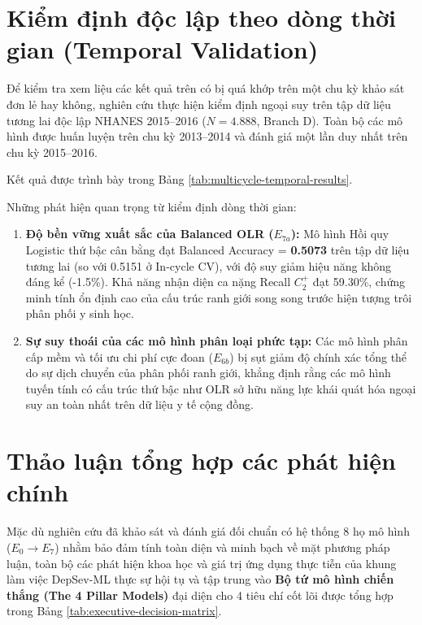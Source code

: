 \section{Kiểm định độc lập theo dòng thời gian (Temporal Validation)}
\label{sec:temporal-results}

Để kiểm tra xem liệu các kết quả trên có bị quá khớp trên một chu kỳ khảo sát đơn lẻ hay không, nghiên cứu thực hiện kiểm định ngoại suy trên tập dữ liệu tương lai độc lập NHANES 2015--2016 ($N = 4.888$, Branch D). Toàn bộ các mô hình được huấn luyện trên chu kỳ 2013--2014 và đánh giá một lần duy nhất trên chu kỳ 2015--2016.

Kết quả được trình bày trong Bảng \ref{tab:multicycle-temporal-results}.



Những phát hiện quan trọng từ kiểm định dòng thời gian:
\begin{enumerate}
    \item \textbf{Độ bền vững xuất sắc của Balanced OLR ($E_{7a}$):} Mô hình Hồi quy Logistic thứ bậc cân bằng đạt Balanced Accuracy = \textbf{0.5073} trên tập dữ liệu tương lai (so với 0.5151 ở In-cycle CV), với độ suy giảm hiệu năng không đáng kể (-1.5\%). Khả năng nhận diện ca nặng Recall $C_2^+$ đạt 59.30\%, chứng minh tính ổn định cao của cấu trúc ranh giới song song trước hiện tượng trôi phân phối y sinh học.
    \item \textbf{Sự suy thoái của các mô hình phân loại phức tạp:} Các mô hình phân cấp mềm và tối ưu chi phí cực đoan ($E_{6b}$) bị sụt giảm độ chính xác tổng thể do sự dịch chuyển của phân phối ranh giới, khẳng định rằng các mô hình tuyến tính có cấu trúc thứ bậc như OLR sở hữu năng lực khái quát hóa ngoại suy an toàn nhất trên dữ liệu y tế cộng đồng.
\end{enumerate}

\section{Thảo luận tổng hợp các phát hiện chính}
\label{sec:thao-luan-tong-hop}

Mặc dù nghiên cứu đã khảo sát và đánh giá đối chuẩn có hệ thống 8 họ mô hình ($E_0 \to E_7$) nhằm bảo đảm tính toàn diện và minh bạch về mặt phương pháp luận, toàn bộ các phát hiện khoa học và giá trị ứng dụng thực tiễn của khung làm việc DepSev-ML thực sự hội tụ và tập trung vào \textbf{Bộ tứ mô hình chiến thắng (The 4 Pillar Models)} đại diện cho 4 tiêu chí cốt lõi được tổng hợp trong Bảng \ref{tab:executive-decision-matrix}.

